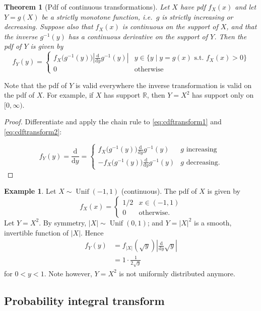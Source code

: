 \documentclass[
]{book}
\DeclareMathOperator{\Unif}{Unif}
\newcommand{\bbR}{\mathbb{R}}
\newcommand{\ddif}{\text{d}}
\newtheorem{theorem}{Theorem}[chapter]
\theoremstyle{definition}
\theoremstyle{definition}
\newtheorem{example}{Example}[chapter]
\theoremstyle{definition}
\theoremstyle{definition}
\theoremstyle{remark}
\begin{document}
\begin{theorem}[Pdf of continuous transformations]
Let \(X\) have pdf \(f_X(x)\) and let \(Y=g(X)\) be a strictly monotone function, i.e.~\(g\) is strictly increasing or decreasing.
Suppose also that \(f_X(x)\) is continuous on the support of \(X\), and that the inverse \(g^{-1}(y)\) has a continuous derivative on the support of \(Y\).
Then the pdf of \(Y\) is given by
\[
f_Y(y) = \begin{cases}
f_X\big(g^{-1}(y)\big) \left| \frac{\ddif}{\ddif y}g^{-1}(y) \right| & y \in \{y\mid y=g(x) \text{ s.t. } f_X(x)>0\} \\
0 &\text{otherwise}
\end{cases}
\]
\end{theorem}

Note that the pdf of \(Y\) is valid everywhere the inverse transformation is valid on the pdf of \(X\).
For example, if \(X\) has support \(\bbR\), then \(Y=X^2\) has support only on \([0,\infty)\).

\begin{proof}
Differentiate and apply the chain rule to \eqref{eq:cdftransform1} and \eqref{eq:cdftransform2}:

\[
f_Y(y)=\frac{\ddif}{\ddif y} = \begin{cases}
f_X\big(g^{-1}(y)\big)  \frac{\ddif}{\ddif y}g^{-1}(y) &g \text{ increasing} \\
-f_X\big(g^{-1}(y)\big)  \frac{\ddif}{\ddif y}g^{-1}(y) &g \text{ decreasing.}
\end{cases}
\]
\end{proof}

\begin{example}
Let \(X\sim\Unif(-1,1)\) (continuous). The pdf of \(X\) is given by
\[
f_X(x) = \begin{cases}
1/2 & x \in (-1,1) \\
0 & \text{otherwise.}
\end{cases}
\]
Let \(Y=X^2\).
By symmetry, \(|X|\sim\Unif(0,1)\); and \(Y=|X|^2\) is a smooth, invertible function of \(|X|\). Hence
\begin{align*}
f_Y(y) 
&= f_{|X|}(\sqrt y)\left| \frac{\ddif}{\ddif y} \sqrt y \right| \\
&= 1 \cdot \frac{1}{2\sqrt y}
\end{align*}
for \(0<y<1\).
Note however, \(Y=X^2\) is not uniformly distributed anymore.
\end{example}

\hypertarget{probability-integral-transform}{%
\subsection{Probability integral transform}\label{probability-integral-transform}}
\end{document}
